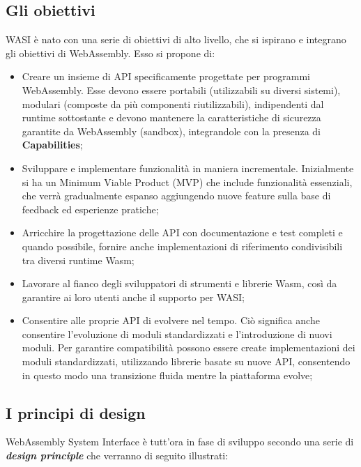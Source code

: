 \subsection{Gli obiettivi}
WASI è nato con una serie di obiettivi di alto livello, che si ispirano e integrano gli obiettivi di WebAssembly.\cite*{wasi:goals} Esso si propone di:
\begin{itemize}
        \item Creare un insieme di API specificamente progettate per programmi WebAssembly. Esse devono essere portabili (utilizzabili su diversi sistemi), modulari (composte da più componenti riutilizzabili), indipendenti dal runtime sottostante e devono mantenere la caratteristiche di sicurezza garantite da WebAssembly (sandbox), integrandole con la presenza di \textbf{Capabilities};
        \item Sviluppare e implementare funzionalità in maniera incrementale. Inizialmente si ha un Minimum Viable Product (MVP) che include funzionalità essenziali, che verrà gradualmente espanso aggiungendo nuove feature sulla base di feedback ed esperienze pratiche;
        \item Arricchire la progettazione delle API con documentazione e test completi e quando possibile, fornire anche implementazioni di riferimento condivisibili tra diversi runtime Wasm;
        \item Lavorare al fianco degli sviluppatori di strumenti e librerie Wasm, così da garantire ai loro utenti anche il supporto per WASI;
        \item Consentire alle proprie API di evolvere nel tempo. Ciò significa anche consentire l'evoluzione di moduli standardizzati e l'introduzione di nuovi moduli. Per garantire compatibilità possono essere create implementazioni dei moduli standardizzati, utilizzando librerie basate su nuove API, consentendo in questo modo una transizione fluida mentre la piattaforma evolve;
\end{itemize}
\subsection{I principi di design}
WebAssembly System Interface è tutt'ora in fase di sviluppo secondo una serie di \emph{\textbf{design principle}} che verranno di seguito illustrati:\cite*{wasi:designPrinciples}
